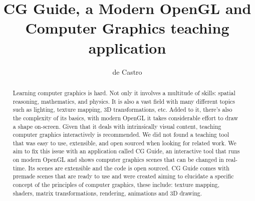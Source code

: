 \documentclass[cic,tc,english]{iiufrgs}
\title{CG Guide, a Modern OpenGL and Computer Graphics teaching application}
\author{de Castro}{Guilherme Cattani}
\begin{document}
\maketitle




\begin{abstract}
    Learning computer graphics is hard. Not only it involves a multitude of skills: spatial reasoning, mathematics, and physics. It is also a vast field with many different topics such as lighting, texture mapping, 3D transformations, etc. Added to it, there's also the complexity of its basics, with modern OpenGL it takes considerable effort to draw a shape on-screen. Given that it deals with intrinsically visual content, teaching computer graphics interactively is recommended. We did not found a teaching tool that was easy to use, extensible, and open sourced when looking for related work. We aim to fix this issue with an application called CG Guide, an interactive tool that runs on modern OpenGL and shows computer graphics scenes that can be changed in real-time. Its scenes are extensible and the code is open sourced. CG Guide comes with premade scenes that are ready to use and were created aiming to elucidate a specific concept of the principles of computer graphics, these include: texture mapping, shaders, matrix transformations, rendering, animations and 3D drawing.
\end{abstract}

\end{document}
